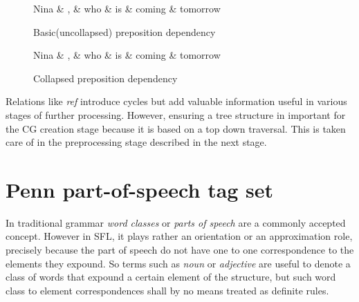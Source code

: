 \begin{figure}
	\centering
	\begin{minipage}[b]{0.45\textwidth}
		
		\begin{dependency}
			\begin{deptext}[]
				Nina \& , \& who \& is \& coming \& tomorrow\\ %
			\end{deptext}
		\end{dependency}
		\caption{Basic(uncollapsed) preposition dependency}
		\label{fig:rel-transf1}
	\end{minipage}
	\quad
	\begin{minipage}[b]{0.45\textwidth}
		\centering
		\begin{dependency}
			\begin{deptext}[]
				Nina \& , \& who \& is \& coming \& tomorrow\\ %
			\end{deptext}
		\end{dependency}
		\caption{Collapsed preposition dependency}
		\label{fig:rel-transf2}
	\end{minipage}
\end{figure}

Relations like \textit{ref} introduce cycles but add valuable information useful in various stages of further processing. However, ensuring a tree structure in important for the CG creation stage because it is based on a top down traversal. This is taken care of in the preprocessing stage described in the next stage.

\section{Penn part-of-speech tag set}
In traditional grammar \textit{word classes} or \textit{parts of speech} are a commonly accepted concept. However in SFL, it plays rather an orientation or an approximation role, precisely because the part of speech do not have one to one correspondence to the elements they expound. So terms such as \textit{noun} or \textit{adjective} are useful to denote a class of words that expound a certain element of the structure, but such word class to element correspondences shall by no means treated as definite rules. 

